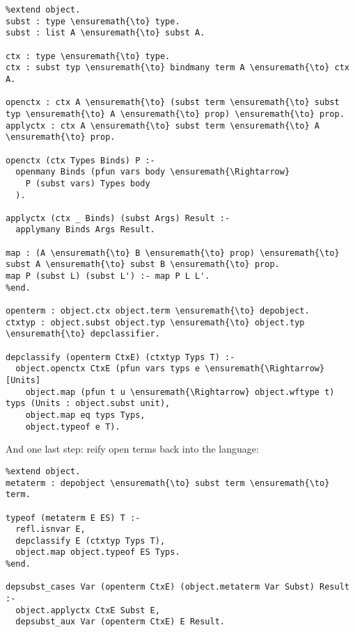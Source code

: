 \begin{verbatim}
%extend object.
subst : type \ensuremath{\to} type.
subst : list A \ensuremath{\to} subst A.

ctx : type \ensuremath{\to} type.
ctx : subst typ \ensuremath{\to} bindmany term A \ensuremath{\to} ctx A.

openctx : ctx A \ensuremath{\to} (subst term \ensuremath{\to} subst typ \ensuremath{\to} A \ensuremath{\to} prop) \ensuremath{\to} prop.
applyctx : ctx A \ensuremath{\to} subst term \ensuremath{\to} A \ensuremath{\to} prop.

openctx (ctx Types Binds) P :-
  openmany Binds (pfun vars body \ensuremath{\Rightarrow}
    P (subst vars) Types body
  ).

applyctx (ctx _ Binds) (subst Args) Result :-
  applymany Binds Args Result.

map : (A \ensuremath{\to} B \ensuremath{\to} prop) \ensuremath{\to} subst A \ensuremath{\to} subst B \ensuremath{\to} prop.
map P (subst L) (subst L') :- map P L L'.
%end.

openterm : object.ctx object.term \ensuremath{\to} depobject.
ctxtyp : object.subst object.typ \ensuremath{\to} object.typ \ensuremath{\to} depclassifier.

depclassify (openterm CtxE) (ctxtyp Typs T) :-
  object.openctx CtxE (pfun vars typs e \ensuremath{\Rightarrow} [Units]
    object.map (pfun t u \ensuremath{\Rightarrow} object.wftype t) typs (Units : object.subst unit),
    object.map eq typs Typs,
    object.typeof e T).
\end{verbatim}

And one last step: reify open terms back into the language:

\begin{verbatim}
%extend object.
metaterm : depobject \ensuremath{\to} subst term \ensuremath{\to} term.

typeof (metaterm E ES) T :-
  refl.isnvar E,
  depclassify E (ctxtyp Typs T),
  object.map object.typeof ES Typs.
%end.

depsubst_cases Var (openterm CtxE) (object.metaterm Var Subst) Result :-
  object.applyctx CtxE Subst E,
  depsubst_aux Var (openterm CtxE) E Result.
\end{verbatim}
